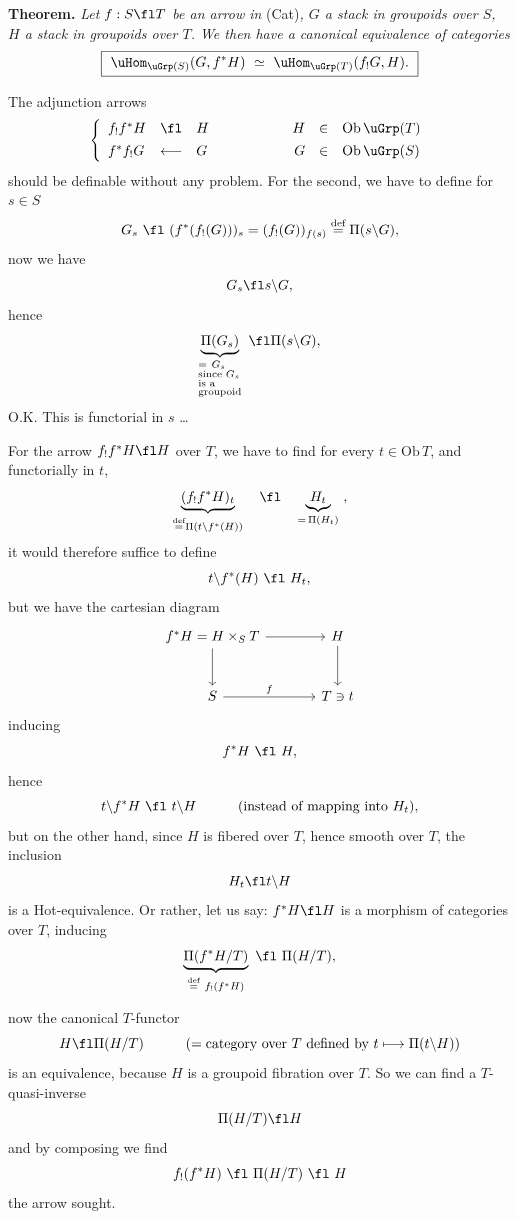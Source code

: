 
\textbf{Theorem.} \textit{Let $f : S \fl T$ be an arrow in} (Cat)\textit{, $G$ a stack in groupoids over $S$, $H$ a stack in groupoids over $T$. We then have a canonical equivalence of categories}
\[
\boxed{\ \uHom_{\uGrp(S)}(G, f^*H) \ \simeq\ \uHom_{\uGrp(T)}(f_!G, H).\ }
\]

The adjunction arrows
\[
\left\{
\begin{array}{lclcrcl}
f_!f^*H & \fl & H & \qquad\qquad & H & \in & \mathrm{Ob}\,\uGrp(T)\\[4pt]
f^*f_!G & \longleftarrow & G & \qquad\qquad & G & \in & \mathrm{Ob}\,\uGrp(S)
\end{array}
\right.
\]
should be definable without any problem. For the second, we have to define for $s \in S$
\[
G_s \ \fl\ (f^*(f_!(G)))_s = (f_!(G))_{f(s)} \overset{\text{def}}{=} \Pi(s\backslash G),
\]
now we have
\[
G_s \fl s\backslash G,
\]
hence
\[
\underbrace{\Pi(G_s)}_{\begin{subarray}{l} =\ G_s\\ \text{since } G_s\\ \text{is a}\\ \text{groupoid}\end{subarray}} \ \fl \Pi(s\backslash G),
\]
O.K. This is functorial in $s$ \dots

For the arrow $f_!f^*H \fl H$ over $T$, we have to find for every $t \in \mathrm{Ob}\,T$, and functorially in $t$,
\[
\underbrace{(f_!f^*H)_t}_{\overset{\text{def}}{=}\Pi(t\backslash f^*(H))} \quad \fl \quad \underbrace{H_t}_{=\,\Pi(H_t)} \ ,
\]
it would therefore suffice to define
\[
t\backslash f^*(H) \ \fl\ H_t,
\]
but we have the cartesian diagram
\[
\begin{tikzcd}[column sep=large, row sep=large]
f^*H = H \times_S T \arrow[r] \arrow[d] & H \arrow[d] \\
S \arrow[r, "f"] & T \ni t
\end{tikzcd}
\]
 inducing
\[
f^*H \ \fl\ H,
\]
hence
\[
t\backslash f^*H \ \fl\ t\backslash H \qquad\quad \text{(instead of mapping into $H_t$),}
\]
but on the other hand, since $H$ is fibered over $T$, hence smooth over $T$, the inclusion
\[
H_t \fl t\backslash H
\]
is a Hot-equivalence. Or rather, let us say: $f^*H \fl H$ is a morphism of categories over $T$, inducing
\[
\underbrace{\Pi(f^*H/T)}_{\overset{\text{def}}{=}\ f_!(f^*H)} \ \fl\ \Pi(H/T),
\]

now the canonical $T$-functor
\[
H \fl \Pi(H/T) \qquad\quad (= \text{category over } T \text{ defined by } t \longmapsto \Pi(t\backslash H))
\]
is an equivalence, because $H$ is a groupoid fibration over $T$. So we can find a $T$-quasi-inverse
\[
\Pi(H/T) \fl H
\]
and by composing we find
\[
f_!(f^*H) \ \fl\ \Pi(H/T) \ \fl\ H
\]
the arrow sought.

